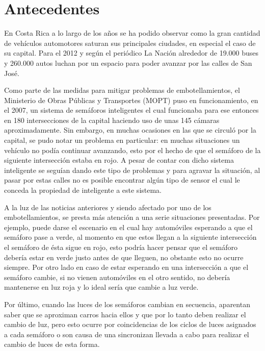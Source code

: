 \section{Antecedentes}
	
	
		En Costa Rica a lo largo de los a\~{n}os se ha podido observar como la gran
	cantidad de veh\'{i}culos automotores saturan sus principales ciudades, en especial
	el caso de su capital. Para el 2012 y seg\'{u}n el peri\'{o}dico La Naci\'{o}n
	alrededor de 19.000 buses y 260.000 autos luchan por un espacio para poder avanzar por las calles de San Jos\'{e}. \cite{Villegas2012}
	
		Como parte de las medidas para mitigar problemas de embotellamientos, el
	Ministerio de Obras P\'{u}blicas y Transportes (MOPT) puso en funcionamiento,
	en el 2007, un sistema de sem\'{a}foros inteligentes el cual funcionaba para
	ese entonces en 180 intersecciones de la capital haciendo uso de unas 145
	c\'{a}maras aproximadamente. Sin embargo, en muchas ocasiones en las que se
	circul\'{o} por la capital, se pudo notar un problema en particular: en muchas
	situaciones un veh\'{i}culo no pod\'{i}a continuar avanzando, esto por el hecho
	de que el sem\'{a}foro de la siguiente intersecci\'{o}n estaba en rojo. A pesar
	de contar con dicho sistema inteligente se segu\'{i}an dando este tipo de
	problemas y para agravar la situaci\'{o}n, al pasar por estas calles no es
	posible encontrar alg\'{u}n tipo de sensor el cual le conceda la propiedad de inteligente a este sistema.\cite{Loaiza2007}
	
		A la luz de las noticias anteriores y siendo afectado por uno de los
	embotellamientos, se presta m\'{a}s atenci\'{o}n a una serie situaciones presentadas.
	Por ejemplo, puede darse el escenario en el cual hay autom\'{o}viles esperando
	a que el sem\'{a}foro pase a verde, al momento en que estos llegan a la
	siguiente intersecci\'{o}n el sem\'{a}foro de \'{e}sta sigue en rojo, esto
	podr\'{i}a hacer pensar que el sem\'{a}foro deber\'{i}a estar en verde justo antes de que lleguen, no obstante esto no ocurre siempre. Por otro lado en caso de estar esperando en una intersecci\'{o}n a que el sem\'{a}foro cambie, si no vienen autom\'{o}viles en el otro sentido, no deber\'{i}a mantenerse en luz roja y lo ideal ser\'{i}a que cambie a luz verde.
		
		Por \'{u}ltimo, cuando las luces de los sem\'{a}foros cambian en secuencia, aparentan
	saber que se aproximan carros hacia ellos y que por lo tanto deben realizar el
	cambio de luz, pero esto ocurre por coincidencias de los ciclos de luces
	asignados a cada sem\'{a}foro o son causa de una sincronizan llevada a cabo para realizar el cambio de luces de esta forma.

